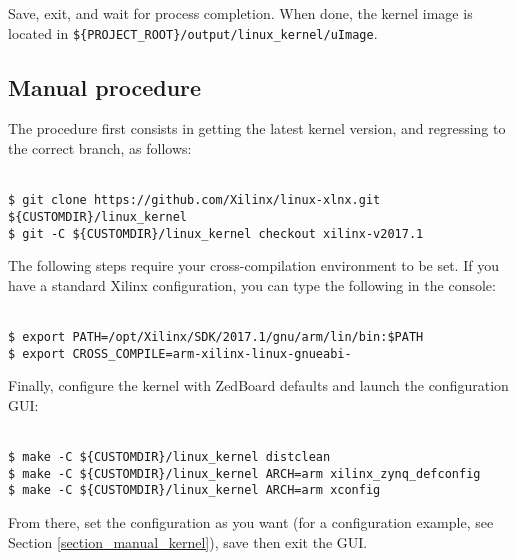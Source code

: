 \documentclass[openany,a4paper]{book}
\begin{document}
Save, exit, and wait for process completion.
When done, the kernel image is located in \nolinkurl{${PROJECT_ROOT}/output/linux_kernel/uImage}.

\subsection{Manual procedure}

The procedure first consists in getting the latest kernel version, and regressing to the correct branch, as follows:

\begin{tabbing}
\kill \hspace{1cm} \= \\
\> \texttt{\$ git clone https://github.com/Xilinx/linux-xlnx.git \$\{CUSTOMDIR\}/linux\_kernel} \\
\> \texttt{\$ git -C \$\{CUSTOMDIR\}/linux\_kernel checkout xilinx-v2017.1} \\
\end{tabbing}

The following steps require your cross-compilation environment to be set.
If you have a standard Xilinx configuration, you can type the following in the console:

\begin{tabbing}
\kill \hspace{1cm} \= \\
\> \texttt{\$ export PATH=/opt/Xilinx/SDK/2017.1/gnu/arm/lin/bin:\$PATH}\\
\> \texttt{\$ export CROSS\_COMPILE=arm-xilinx-linux-gnueabi-}\\
\end{tabbing}

Finally, configure the kernel with ZedBoard defaults and launch the configuration GUI:

\begin{tabbing}
\kill \hspace{1cm} \= \\
\> \texttt{\$ make -C \$\{CUSTOMDIR\}/linux\_kernel distclean}\\
\> \texttt{\$ make -C \$\{CUSTOMDIR\}/linux\_kernel ARCH=arm xilinx\_zynq\_defconfig}\\
\> \texttt{\$ make -C \$\{CUSTOMDIR\}/linux\_kernel ARCH=arm xconfig}\\
\end{tabbing}

From there, set the configuration as you want (for a configuration example, see Section \ref{section_manual_kernel}), save then exit the GUI.
\end{document}
